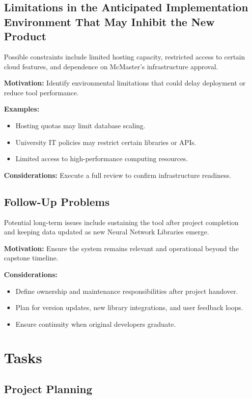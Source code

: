 \documentclass[12pt]{article}
\begin{document}
\subsection{Limitations in the Anticipated Implementation Environment That May Inhibit the New Product}

Possible constraints include limited hosting capacity, restricted access to certain cloud features, and dependence on McMaster’s infrastructure approval.

\textbf{Motivation:} Identify environmental limitations that could delay deployment or reduce tool performance.

\textbf{Examples:}
\begin{itemize}
    \item Hosting quotas may limit database scaling.
    \item University IT policies may restrict certain libraries or APIs.
    \item Limited access to high-performance computing resources.
\end{itemize}

\textbf{Considerations:} Execute a full review to confirm infrastructure readiness.

\subsection{Follow-Up Problems}

Potential long-term issues include sustaining the tool after project completion and keeping data updated as new Neural Network Libraries emerge.

\textbf{Motivation:} Ensure the system remains relevant and operational beyond the capstone timeline.

\textbf{Considerations:}
\begin{itemize}
    \item Define ownership and maintenance responsibilities after project handover.
    \item Plan for version updates, new library integrations, and user feedback loops.
    \item Ensure continuity when original developers graduate.
\end{itemize}


\section{Tasks}

\subsection{Project Planning}
\end{document}
